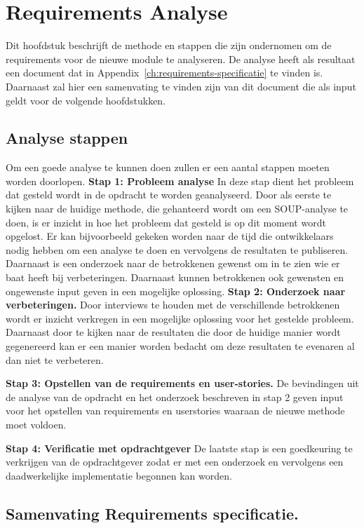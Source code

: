 
\chapter{Requirements Analyse}\label{ch:requirements-analyse}
Dit hoofdstuk beschrijft de methode en stappen die zijn ondernomen om de requirements voor de nieuwe module te analyseren. De analyse heeft als resultaat een document dat in Appendix~\ref{ch:requirements-specificatie} te vinden is. Daarnaast zal hier een samenvating te vinden zijn van dit document die als input geldt voor de volgende hoofdstukken.

\section{Analyse stappen}\label{sec:analyse-stappen}
Om een goede analyse te kunnen doen zullen er een aantal stappen  moeten worden doorlopen.
\textbf{Stap 1: Probleem analyse}
In deze stap dient het probleem dat gesteld wordt in de opdracht te worden geanalyseerd. Door als eerste te kijken naar de huidige methode, die gehanteerd wordt om een SOUP-analyse te doen, is er inzicht in hoe het probleem dat gesteld is op dit moment wordt opgelost. Er kan bijvoorbeeld gekeken worden naar de tijd die ontwikkelaars nodig hebben om een analyse te doen en vervolgens de resultaten te publiseren. Daarnaast is een onderzoek naar de betrokkenen gewenst om in te zien wie er baat heeft bij verbeteringen. Daarnaast kunnen betrokkenen ook gewensten en ongewenste input geven in een mogelijke oplossing.
\textbf{Stap 2: Onderzoek naar verbeteringen.}
Door interviews te houden met de verschillende betrokkenen wordt er inzicht verkregen in een mogelijke oplossing voor het gestelde probleem. Daarnaast door te kijken naar de resultaten die door de huidige manier wordt gegenereerd kan er een manier worden bedacht om deze resultaten te evenaren al dan niet te verbeteren.

\textbf{Stap 3: Opstellen van de requirements en user-stories.}
De bevindingen uit de analyse van de opdracht en het onderzoek beschreven in stap 2 geven input voor het opstellen van requirements en userstories waaraan de nieuwe methode moet voldoen.

\textbf{Stap 4: Verificatie met opdrachtgever}
De laatste stap is een goedkeuring te verkrijgen van de opdrachtgever zodat er met een onderzoek en vervolgens een daadwerkelijke implementatie begonnen kan worden.

\section{Samenvating Requirements specificatie.}\label{sec:samenvating-requirements-specificatie.}

